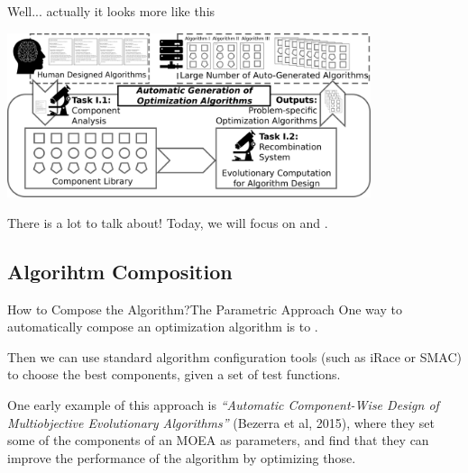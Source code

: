 \documentclass[aspectratio=169]{beamer}
\begin{document}
\begin{frame}{Well... actually it looks more like this}
  \begin{center}
    \includegraphics[width=0.8\textwidth]{img/algorithmdesign_project.png}
  \end{center}
  There is a lot to talk about! Today, we will focus on  and .
\end{frame}

\subsection{Algorihtm Composition}

\begin{frame}{How to Compose the Algorithm?}{The Parametric Approach}
  One way to automatically compose an optimization algorithm is to
  .\bigskip

  Then we can use standard algorithm configuration tools (such as
  iRace or SMAC) to choose the best components, given a set of test
  functions.\bigskip

  One early example of this approach is \emph{``Automatic
  Component-Wise Design of Multiobjective Evolutionary Algorithms''}
  (Bezerra et al, 2015), where they set some of the components of an
  MOEA as parameters, and find that they can improve the performance
  of the algorithm by optimizing those.
\end{frame}
\end{document}
